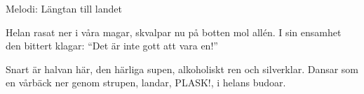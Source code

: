 \begin{song}

\begin{songmeta}
Melodi: Längtan till landet
\end{songmeta}

\begin{songtext}
Helan rasat ner i våra magar,
skvalpar nu på botten mol allén.
I sin ensamhet den bittert klagar:
\textquotedblleft{}Det är inte gott att vara en!\textquotedblright{}

Snart är halvan här, den härliga supen,
alkoholiskt ren och silverklar.
Dansar som en vårbäck ner genom strupen,
landar, PLASK!, i helans budoar.
\end{songtext}
\end{song}
